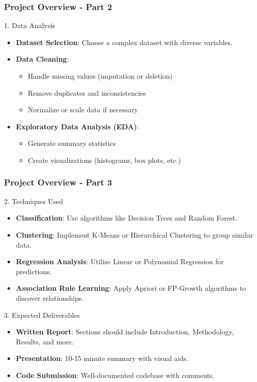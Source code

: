 \documentclass[aspectratio=169]{beamer}
\begin{document}
\begin{frame}[fragile]
    \frametitle{Project Overview - Part 2}

    \begin{block}{1. Data Analysis}
        \begin{itemize}
            \item \textbf{Dataset Selection}: Choose a complex dataset with diverse variables.
            \item \textbf{Data Cleaning}:
            \begin{itemize}
                \item Handle missing values (imputation or deletion)
                \item Remove duplicates and inconsistencies
                \item Normalize or scale data if necessary
            \end{itemize}
            \item \textbf{Exploratory Data Analysis (EDA)}:
            \begin{itemize}
                \item Generate summary statistics
                \item Create visualizations (histograms, box plots, etc.)
            \end{itemize}
        \end{itemize}
    \end{block}
\end{frame}

\begin{frame}[fragile]
    \frametitle{Project Overview - Part 3}

    \begin{block}{2. Techniques Used}
        \begin{itemize}
            \item \textbf{Classification}: Use algorithms like Decision Trees and Random Forest.
            \item \textbf{Clustering}: Implement K-Means or Hierarchical Clustering to group similar data.
            \item \textbf{Regression Analysis}: Utilize Linear or Polynomial Regression for predictions.
            \item \textbf{Association Rule Learning}: Apply Apriori or FP-Growth algorithms to discover relationships.
        \end{itemize}
    \end{block}
    
    \begin{block}{3. Expected Deliverables}
        \begin{itemize}
            \item \textbf{Written Report}: Sections should include Introduction, Methodology, Results, and more.
            \item \textbf{Presentation}: 10-15 minute summary with visual aids.
            \item \textbf{Code Submission}: Well-documented codebase with comments.
        \end{itemize}
    \end{block}
\end{frame}
\end{document}
